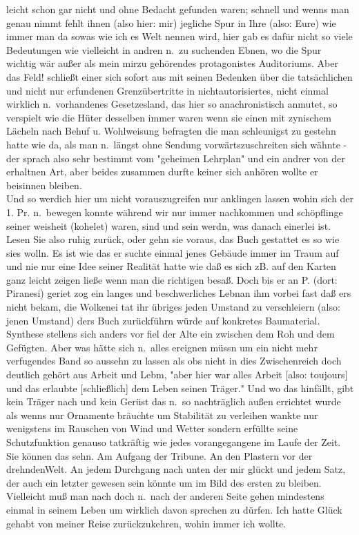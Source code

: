 \documentclass[
]{article}
\begin{document}
leicht schon gar nicht und ohne Bedacht gefunden waren; schnell und
wenns man genau nimmt fehlt ihnen (also hier: mir) jegliche Spur in Ihre
(also: Eure) wie immer man da sowas wie ich es Welt nennen wird, hier
gab es dafür nicht so viele Bedeutungen wie vielleicht in andren n.~zu
suchenden Ebnen, wo die Spur wichtig wär außer als mein mirzu gehörendes
protagonistes Auditoriums. Aber das Feld! schließt einer sich sofort aus
mit seinen Bedenken über die tatsächlichen und nicht nur erfundenen
Grenzübertritte in nichtautorisiertes, nicht einmal wirklich
n.~vorhandenes Gesetzesland, das hier so anachronistisch anmutet, so
verspielt wie die Hüter desselben immer waren wenn sie einen mit
zynischem Lächeln nach Behuf u. Wohlweisung befragten die man
schleunigst zu gestehn hatte wie da, als man n.~längst ohne Sendung
vorwärtszuschreiten sich wähnte - der sprach also sehr bestimmt vom
"geheimen Lehrplan" und ein andrer von der erhaltnen Art, aber beides
zusammen durfte keiner sich anhören wollte er beisinnen bleiben.\\
Und so werdich hier um nicht vorauszugreifen nur anklingen lassen wohin
sich der 1. Pr. n.~bewegen konnte während wir nur immer nachkommen und
schöpflinge seiner weisheit (kohelet) waren, sind und sein werdn, was
danach einerlei ist. Lesen Sie also ruhig zurück, oder gehn sie voraus,
das Buch gestattet es so wie sies wolln. Es ist wie das er suchte einmal
jenes Gebäude immer im Traum auf und nie nur eine Idee seiner Realität
hatte wie daß es sich zB. auf den Karten ganz leicht zeigen ließe wenn
man die richtigen besaß. Doch bis er an P. (dort: Piranesi) geriet zog
ein langes und beschwerliches Lebnan ihm vorbei fast daß ers nicht
bekam, die Wolkenei tat ihr übriges jeden Umstand zu verschleiern (also:
jenen Umstand) ders Buch zurückführn würde auf konkretes Baumaterial.
Synthese stellens sich anders vor fiel der Alte ein zwischen dem Roh und
dem Gefügten. Aber was hätte sich n.~alles ereignen müssn um ein nicht
mehr verfugendes Band so aussehn zu lassen als obs nicht in dies
Zwischenreich doch deutlich gehört aus Arbeit und Lebm, "aber hier war
alles Arbeit {[}also: toujours{]} und das erlaubte {[}schließlich{]} dem
Leben seinen Träger." Und wo das hinfällt, gibt kein Träger nach und
kein Gerüst das n.~so nachträglich außen errichtet wurde als wenns nur
Ornamente bräuchte um Stabilität zu verleihen wankte nur wenigstens im
Rauschen von Wind und Wetter sondern erfüllte seine Schutzfunktion
genauso tatkräftig wie jedes vorangegangene im Laufe der Zeit. Sie
können das sehn. Am Aufgang der Tribune. An den Plastern vor der
drehndenWelt. An jedem Durchgang nach unten der mir glückt und jedem
Satz, der auch ein letzter gewesen sein könnte um im Bild des ersten zu
bleiben.\\
Vielleicht muß man nach doch n.~nach der anderen Seite gehen mindestens
einmal in seinem Leben um wirklich davon sprechen zu dürfen. Ich hatte
Glück gehabt von meiner Reise zurückzukehren, wohin immer ich wollte.
\end{document}
